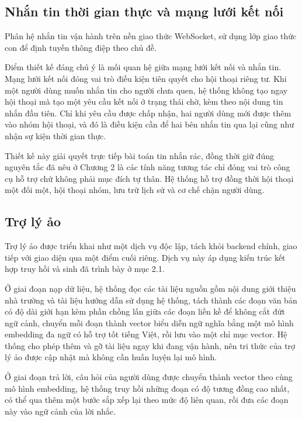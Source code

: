 \documentclass[12pt,a4paper,oneside]{report}
\begin{document}
\subsection{Nhắn tin thời gian thực và mạng lưới kết nối}

Phân hệ nhắn tin vận hành trên nền giao thức WebSocket, sử dụng lớp giao thức con để định tuyến thông điệp theo chủ đề.

Điểm thiết kế đáng chú ý là mối quan hệ giữa mạng lưới kết nối và nhắn tin. Mạng lưới kết nối đóng vai trò điều kiện tiên quyết cho hội thoại riêng tư. Khi một người dùng muốn nhắn tin cho người chưa quen, hệ thống không tạo ngay hội thoại mà tạo một yêu cầu kết nối ở trạng thái chờ, kèm theo nội dung tin nhắn đầu tiên. Chỉ khi yêu cầu được chấp nhận, hai người dùng mới được thêm vào nhóm hội thoại, và đó là điều kiện cần để hai bên nhắn tin qua lại cũng như nhận sự kiện thời gian thực.

Thiết kế này giải quyết trực tiếp bài toán tin nhắn rác, đồng thời giữ đúng nguyên tắc đã nêu ở Chương 2 là các tính năng tương tác chỉ đóng vai trò công cụ hỗ trợ chứ không phải mục đích tự thân. Hệ thống hỗ trợ đồng thời hội thoại một đối một, hội thoại nhóm, lưu trữ lịch sử và cơ chế chặn người dùng.

\subsection{Trợ lý ảo}

Trợ lý ảo được triển khai như một dịch vụ độc lập, tách khỏi backend chính, giao tiếp với giao diện qua một điểm cuối riêng. Dịch vụ này áp dụng kiến trúc kết hợp truy hồi và sinh đã trình bày ở mục 2.1.

Ở giai đoạn nạp dữ liệu, hệ thống đọc các tài liệu nguồn gồm nội dung giới thiệu nhà trường và tài liệu hướng dẫn sử dụng hệ thống, tách thành các đoạn văn bản có độ dài giới hạn kèm phần chồng lấn giữa các đoạn liền kề để không cắt đứt ngữ cảnh, chuyển mỗi đoạn thành vector biểu diễn ngữ nghĩa bằng một mô hình embedding đa ngữ có hỗ trợ tốt tiếng Việt, rồi lưu vào một chỉ mục vector. Hệ thống cho phép thêm và gỡ tài liệu ngay khi đang vận hành, nên tri thức của trợ lý ảo được cập nhật mà không cần huấn luyện lại mô hình.

Ở giai đoạn trả lời, câu hỏi của người dùng được chuyển thành vector theo cùng mô hình embedding, hệ thống truy hồi những đoạn có độ tương đồng cao nhất, có thể qua thêm một bước sắp xếp lại theo mức độ liên quan, rồi đưa các đoạn này vào ngữ cảnh của lời nhắc.
\end{document}
